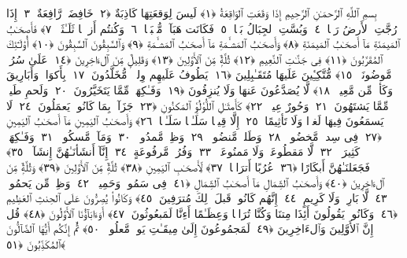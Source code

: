 
  
    
  
    
    

\nopagebreak
  بِسمِ ٱللَّهِ ٱلرَّحمَـٰنِ ٱلرَّحِيمِ
  إِذَا وَقَعَتِ ٱلوَاقِعَةُ ﴿١﴾
 لَيسَ لِوَقعَتِهَا كَاذِبَةٌ ﴿٢﴾
 خَافِضَةٌۭ رَّافِعَةٌ ﴿٣﴾
 إِذَا رُجَّتِ ٱلأَرضُ رَجًّۭا ﴿٤﴾
 وَبُسَّتِ ٱلجِبَالُ بَسًّۭا ﴿٥﴾
 فَكَانَت هَبَآءًۭ مُّنۢبَثًّۭا ﴿٦﴾
 وَكُنتُم أَزوَٟجًۭا ثَلَـٰثَةًۭ ﴿٧﴾
 فَأَصحَـٰبُ ٱلمَيمَنَةِ مَآ أَصحَـٰبُ ٱلمَيمَنَةِ ﴿٨﴾
 وَأَصحَـٰبُ ٱلمَشـَٔمَةِ مَآ أَصحَـٰبُ ٱلمَشـَٔمَةِ ﴿٩﴾
 وَٱلسَّٰبِقُونَ ٱلسَّٰبِقُونَ ﴿١٠﴾
 أُو۟لَـٰٓئِكَ ٱلمُقَرَّبُونَ ﴿١١﴾
 فِى جَنَّـٰتِ ٱلنَّعِيمِ ﴿١٢﴾
 ثُلَّةٌۭ مِّنَ ٱلأَوَّلِينَ ﴿١٣﴾
 وَقَلِيلٌۭ مِّنَ ٱلءَاخِرِينَ ﴿١٤﴾
 عَلَىٰ سُرُرٍۢ مَّوضُونَةٍۢ ﴿١٥﴾
 مُّتَّكِـِٔينَ عَلَيهَا مُتَقَـٰبِلِينَ ﴿١٦﴾
 يَطُوفُ عَلَيهِم وِلدَٟنٌۭ مُّخَلَّدُونَ ﴿١٧﴾
 بِأَكوَابٍۢ وَأَبَارِيقَ وَكَأسٍۢ مِّن مَّعِينٍۢ ﴿١٨﴾
 لَّا يُصَدَّعُونَ عَنهَا وَلَا يُنزِفُونَ ﴿١٩﴾
 وَفَـٰكِهَةٍۢ مِّمَّا يَتَخَيَّرُونَ ﴿٢٠﴾
 وَلَحمِ طَيرٍۢ مِّمَّا يَشتَهُونَ ﴿٢١﴾
 وَحُورٌ عِينٌۭ ﴿٢٢﴾
 كَأَمثَـٰلِ ٱللُّؤلُؤِ ٱلمَكنُونِ ﴿٢٣﴾
 جَزَآءًۢ بِمَا كَانُوا۟ يَعمَلُونَ ﴿٢٤﴾
 لَا يَسمَعُونَ فِيهَا لَغوًۭا وَلَا تَأثِيمًا ﴿٢٥﴾
 إِلَّا قِيلًۭا سَلَـٰمًۭا سَلَـٰمًۭا ﴿٢٦﴾
 وَأَصحَـٰبُ ٱليَمِينِ مَآ أَصحَـٰبُ ٱليَمِينِ ﴿٢٧﴾
 فِى سِدرٍۢ مَّخضُودٍۢ ﴿٢٨﴾
 وَطَلحٍۢ مَّنضُودٍۢ ﴿٢٩﴾
 وَظِلٍّۢ مَّمدُودٍۢ ﴿٣٠﴾
 وَمَآءٍۢ مَّسكُوبٍۢ ﴿٣١﴾
 وَفَـٰكِهَةٍۢ كَثِيرَةٍۢ ﴿٣٢﴾
 لَّا مَقطُوعَةٍۢ وَلَا مَمنُوعَةٍۢ ﴿٣٣﴾
 وَفُرُشٍۢ مَّرفُوعَةٍ ﴿٣٤﴾
 إِنَّآ أَنشَأنَـٰهُنَّ إِنشَآءًۭ ﴿٣٥﴾
 فَجَعَلنَـٰهُنَّ أَبكَارًا ﴿٣٦﴾
 عُرُبًا أَترَابًۭا ﴿٣٧﴾
 لِّأَصحَـٰبِ ٱليَمِينِ ﴿٣٨﴾
 ثُلَّةٌۭ مِّنَ ٱلأَوَّلِينَ ﴿٣٩﴾
 وَثُلَّةٌۭ مِّنَ ٱلءَاخِرِينَ ﴿٤٠﴾
 وَأَصحَـٰبُ ٱلشِّمَالِ مَآ أَصحَـٰبُ ٱلشِّمَالِ ﴿٤١﴾
 فِى سَمُومٍۢ وَحَمِيمٍۢ ﴿٤٢﴾
 وَظِلٍّۢ مِّن يَحمُومٍۢ ﴿٤٣﴾
 لَّا بَارِدٍۢ وَلَا كَرِيمٍ ﴿٤٤﴾
 إِنَّهُم كَانُوا۟ قَبلَ ذَٟلِكَ مُترَفِينَ ﴿٤٥﴾
 وَكَانُوا۟ يُصِرُّونَ عَلَى ٱلحِنثِ ٱلعَظِيمِ ﴿٤٦﴾
 وَكَانُوا۟ يَقُولُونَ أَئِذَا مِتنَا وَكُنَّا تُرَابًۭا وَعِظَـٰمًا أَءِنَّا لَمَبعُوثُونَ ﴿٤٧﴾
 أَوَءَابَآؤُنَا ٱلأَوَّلُونَ ﴿٤٨﴾
 قُل إِنَّ ٱلأَوَّلِينَ وَٱلءَاخِرِينَ ﴿٤٩﴾
 لَمَجمُوعُونَ إِلَىٰ مِيقَـٰتِ يَومٍۢ مَّعلُومٍۢ ﴿٥٠﴾
 ثُمَّ إِنَّكُم أَيُّهَا ٱلضَّآلُّونَ ٱلمُكَذِّبُونَ ﴿٥١﴾
